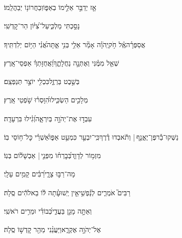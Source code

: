 \documentclass[12pt]{article}
\newcommand{\loc}[1]{\textsuperscript{\locf{#1}}}
\begin{document}
{\loc{ ה}~}‏אָ֤ז יְדַבֵּ֣ר אֵלֵ֣ימוֹ בְאַפּ֑וֹ{\hfill}וּֽבַחֲרוֹנ֥וֹ יְבַהֲלֵֽמוֹ׃\par

{\loc{ ו}~}‏ נָסַ֣כְתִּי מַלְכִּ֑י{\hfill}עַל־צִ֝יּ֗וֹן הַר־קׇדְשִֽׁי׃\par

{\loc{ ז}~}‏אֲסַפְּרָ֗ה{\hfill}אֶֽ֫ל חֹ֥ק\newline\hspace*{.5em}יְֽהֹוָ֗ה אָמַ֘ר אֵלַ֥י בְּנִ֥י אַ֑תָּה{\hfill}אֲ֝נִ֗י הַיּ֥וֹם יְלִדְתִּֽיךָ׃\par

{\loc{ ח}~}‏שְׁאַ֤ל מִמֶּ֗נִּי וְאֶתְּנָ֣ה  נַחֲלָתֶ֑ךָ{\hfill}וַ֝אֲחֻזָּתְךָ֗ אַפְסֵי־אָֽרֶץ׃\par

{\loc{ ט}~}‏ בְּשֵׁ֣בֶט בַּרְזֶ֑ל{\hfill}כִּכְלִ֖י יוֹצֵ֣ר תְּנַפְּצֵֽם׃\par

{\loc{ י}~}‏ מְלָכִ֣ים הַשְׂכִּ֑ילוּ{\hfill}הִ֝וָּסְר֗וּ שֹׁ֣פְטֵי אָֽרֶץ׃\par

{\loc{ יא}~}‏עִבְד֣וּ אֶת־יְהֹוָ֣ה בְּיִרְאָ֑ה{\hfill}וְ֝גִ֗ילוּ בִּרְעָדָֽה׃\par

{\loc{ יב}~}‏נַשְּׁקוּ־בַ֡ר{\hfill}פֶּן־יֶאֱנַ֤ף |  וְתֹ֬אבְדוּ דֶ֗רֶךְ\newline\hspace*{.5em}כִּֽי־יִבְעַ֣ר כִּמְעַ֣ט אַפּ֑וֹ{\hfill}אַ֝שְׁרֵ֗י כׇּל־ח֥וֹסֵי בֽוֹ׃\par\pend
\ledpb
\pstart[\subsection*{\textcolor{red}{פרק ג}}]\label{פרק ג}
{\loc{ א}~}‏מִזְמ֥וֹר לְדָוִ֑ד{\hfill}בְּ֝בׇרְח֗וֹ מִפְּנֵ֤י |  אַבְשָׁל֬וֹם בְּנֽוֹ׃\par

{\loc{ ב}~}‏ מָה־רַבּ֣וּ צָרָ֑י{\hfill}רַ֝בִּ֗ים קָמִ֥ים עָלָֽי׃\par

{\loc{ ג}~}‏רַבִּים֮ אֹמְרִ֢ים לְנַ֫פְשִׁ֥י{\hfill}אֵ֤ין יְֽשׁוּעָ֓תָה לּ֬וֹ בֵאלֹהִ֬ים סֶֽלָה׃\par

{\loc{ ד}~}‏וְאַתָּ֣ה  מָגֵ֣ן בַּעֲדִ֑י{\hfill}כְּ֝בוֹדִ֗י וּמֵרִ֥ים רֹאשִֽׁי׃\par

{\loc{ ה}~}‏ אֶל־יְהֹוָ֣ה אֶקְרָ֑א{\hfill}וַיַּעֲנֵ֨נִי מֵהַ֖ר קׇדְשׁ֣וֹ סֶֽלָה׃\par
\end{document}
